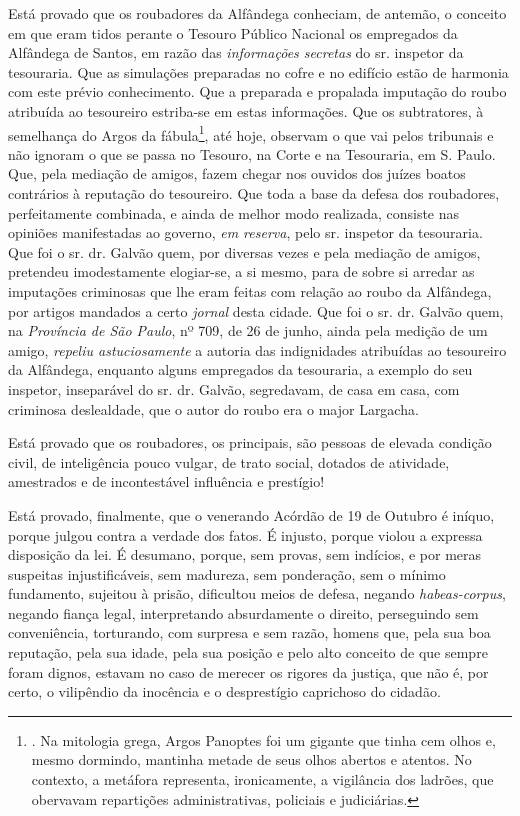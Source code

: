 Está provado que os roubadores da Alfândega conheciam, de antemão, o
conceito em que eram tidos perante o Tesouro Público Nacional os
empregados da Alfândega de Santos, em razão das \emph{informações
secretas} do sr. inspetor da tesouraria. Que as simulações preparadas no
cofre e no edifício estão de harmonia com este prévio conhecimento. Que
a preparada e propalada imputação do roubo atribuída ao tesoureiro
estriba-se em estas informações. Que os subtratores, à semelhança do
Argos da fábula\footnote{. Na mitologia grega, Argos Panoptes foi um
  gigante que tinha cem olhos e, mesmo dormindo, mantinha metade de seus
  olhos abertos e atentos. No contexto, a metáfora representa,
  ironicamente, a vigilância dos ladrões, que obervavam repartições
  administrativas, policiais e judiciárias.}, até hoje, observam o que
vai pelos tribunais e não ignoram o que se passa no Tesouro, na Corte e
na Tesouraria, em S. Paulo. Que, pela mediação de amigos, fazem chegar
nos ouvidos dos juízes boatos contrários à reputação do tesoureiro. Que
toda a base da defesa dos roubadores, perfeitamente combinada, e ainda
de melhor modo realizada, consiste nas opiniões manifestadas ao governo,
\emph{em reserva}, pelo sr. inspetor da tesouraria. Que foi o sr. dr.
Galvão quem, por diversas vezes e pela mediação de amigos, pretendeu
imodestamente elogiar-se, a si mesmo, para de sobre si arredar as
imputações criminosas que lhe eram feitas com relação ao roubo da
Alfândega, por artigos mandados a certo \emph{jornal} desta cidade. Que
foi o sr. dr. Galvão quem, na \emph{Província de São Paulo}, nº 709, de
26 de junho, ainda pela medição de um amigo, \emph{repeliu
astuciosamente} a autoria das indignidades atribuídas ao tesoureiro da
Alfândega, enquanto alguns empregados da tesouraria, a exemplo do seu
inspetor, inseparável do sr. dr. Galvão, segredavam, de casa em casa,
com criminosa deslealdade, que o autor do roubo era o major Largacha.

Está provado que os roubadores, os principais, são pessoas de elevada
condição civil, de inteligência pouco vulgar, de trato social, dotados
de atividade, amestrados e de incontestável influência e prestígio!

Está provado, finalmente, que o venerando Acórdão de 19 de Outubro é
iníquo, porque julgou contra a verdade dos fatos. É injusto, porque
violou a expressa disposição da lei. É desumano, porque, sem provas, sem
indícios, e por meras suspeitas injustificáveis, sem madureza, sem
ponderação, sem o mínimo fundamento, sujeitou à prisão, dificultou meios
de defesa, negando \emph{habeas-corpus}, negando fiança legal,
interpretando absurdamente o direito, perseguindo sem conveniência,
torturando, com surpresa e sem razão, homens que, pela sua boa
reputação, pela sua idade, pela sua posição e pelo alto conceito de que
sempre foram dignos, estavam no caso de merecer os rigores da justiça,
que não é, por certo, o vilipêndio da inocência e o desprestígio
caprichoso do cidadão.

